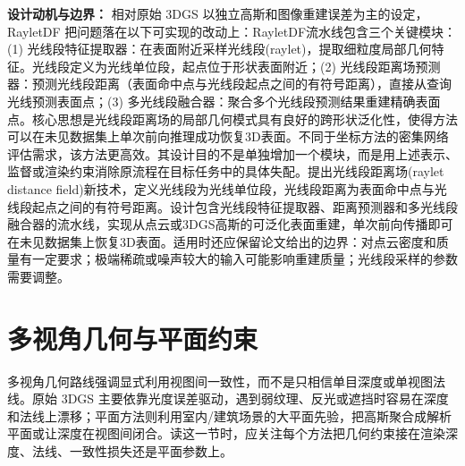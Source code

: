 \textbf{设计动机与边界：} 相对原始 3DGS 以独立高斯和图像重建误差为主的设定，RayletDF 把问题落在以下可实现的改动上：RayletDF流水线包含三个关键模块：(1) 光线段特征提取器：在表面附近采样光线段(raylet)，提取细粒度局部几何特征。光线段定义为光线单位段，起点位于形状表面附近；(2) 光线段距离场预测器：预测光线段距离（表面命中点与光线段起点之间的有符号距离），直接从查询光线预测表面点；(3) 多光线段融合器：聚合多个光线段预测结果重建精确表面点。核心思想是光线段距离场的局部几何模式具有良好的跨形状泛化性，使得方法可以在未见数据集上单次前向推理成功恢复3D表面。不同于坐标方法的密集网络评估需求，该方法更高效。其设计目的不是单独增加一个模块，而是用上述表示、监督或渲染约束消除原流程在目标任务中的具体失配。提出光线段距离场(raylet distance field)新技术，定义光线段为光线单位段，光线段距离为表面命中点与光线段起点之间的有符号距离。设计包含光线段特征提取器、距离预测器和多光线段融合器的流水线，实现从点云或3DGS高斯的可泛化表面重建，单次前向传播即可在未见数据集上恢复3D表面。适用时还应保留论文给出的边界：对点云密度和质量有一定要求；极端稀疏或噪声较大的输入可能影响重建质量；光线段采样的参数需要调整。

\section{多视角几何与平面约束}

多视角几何路线强调显式利用视图间一致性，而不是只相信单目深度或单视图法线。原始 3DGS 主要依靠光度误差驱动，遇到弱纹理、反光或遮挡时容易在深度和法线上漂移；平面方法则利用室内/建筑场景的大平面先验，把高斯聚合成解析平面或让深度在视图间闭合。读这一节时，应关注每个方法把几何约束接在渲染深度、法线、一致性损失还是平面参数上。
